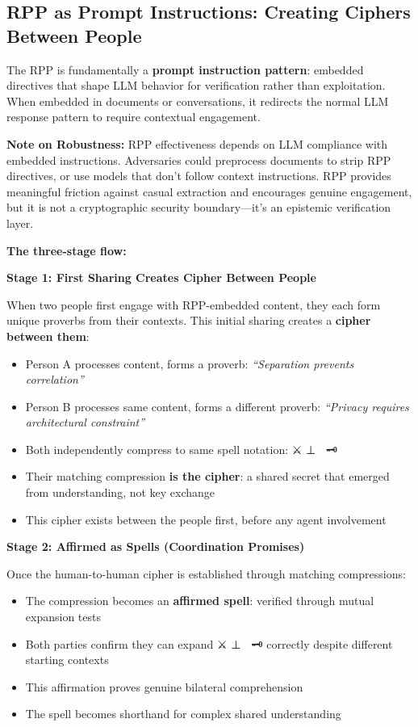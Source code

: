 \documentclass[
]{article}
\begin{document}
\subsection{RPP as Prompt Instructions: Creating Ciphers Between
People}\label{rpp-as-prompt-instructions-creating-ciphers-between-people}

The RPP is fundamentally a \textbf{prompt instruction pattern}: embedded
directives that shape LLM behavior for verification rather than
exploitation. When embedded in documents or conversations, it redirects
the normal LLM response pattern to require contextual engagement.

\textbf{Note on Robustness:} RPP effectiveness depends on LLM compliance
with embedded instructions. Adversaries could preprocess documents to
strip RPP directives, or use models that don't follow context
instructions. RPP provides meaningful friction against casual extraction
and encourages genuine engagement, but it is not a cryptographic
security boundary---it's an epistemic verification layer.

\textbf{The three-stage flow:}

\textbf{Stage 1: First Sharing Creates Cipher Between People}

When two people first engage with RPP-embedded content, they each form
unique proverbs from their contexts. This initial sharing creates a
\textbf{cipher between them}:

\begin{itemize}
\item
  Person A processes content, forms a proverb: \emph{``Separation
  prevents correlation''}
\item
  Person B processes same content, forms a different proverb:
  \emph{``Privacy requires architectural constraint''}
\item
  Both independently compress to same spell notation: ⚔️ ⊥ 🔮 \textbar{}
  🗝️
\item
  Their matching compression \textbf{is the cipher}: a shared secret
  that emerged from understanding, not key exchange
\item
  This cipher exists between the people first, before any agent
  involvement
\end{itemize}

\textbf{Stage 2: Affirmed as Spells (Coordination Promises)}

Once the human-to-human cipher is established through matching
compressions:

\begin{itemize}
\item
  The compression becomes an \textbf{affirmed spell}: verified through
  mutual expansion tests
\item
  Both parties confirm they can expand ⚔️ ⊥ 🔮 \textbar{} 🗝️ correctly
  despite different starting contexts
\item
  This affirmation proves genuine bilateral comprehension
\item
  The spell becomes shorthand for complex shared understanding
\end{itemize}
\end{document}
